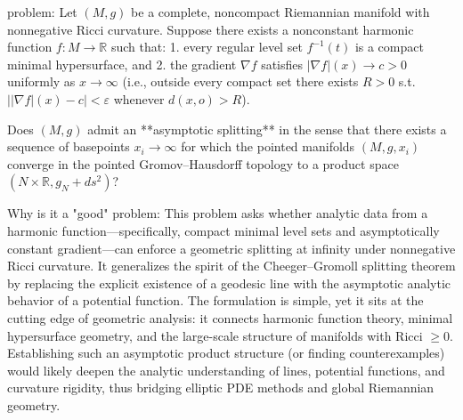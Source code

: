 problem:  
Let \((M,g)\) be a complete, noncompact Riemannian manifold with nonnegative Ricci curvature. Suppose there exists a nonconstant harmonic function \( f : M \to \mathbb{R} \) such that:  
1. every regular level set \( f^{-1}(t) \) is a compact minimal hypersurface, and  
2. the gradient \( \nabla f \) satisfies \( |\nabla f|(x) \to c > 0 \) uniformly as \( x \to \infty \) (i.e., outside every compact set there exists \(R>0\) s.t. \(||\nabla f|(x) - c| < \varepsilon\) whenever \(d(x,o) > R\)).  

Does \( (M,g) \) admit an **asymptotic splitting** in the sense that there exists a sequence of basepoints \(x_i \to \infty\) for which the pointed manifolds \((M,g,x_i)\) converge in the pointed Gromov–Hausdorff topology to a product space \( (N \times \mathbb{R}, g_N + ds^2) \)?  

Why is it a "good" problem:  
This problem asks whether analytic data from a harmonic function—specifically, compact minimal level sets and asymptotically constant gradient—can enforce a geometric splitting at infinity under nonnegative Ricci curvature. It generalizes the spirit of the Cheeger–Gromoll splitting theorem by replacing the explicit existence of a geodesic line with the asymptotic analytic behavior of a potential function. The formulation is simple, yet it sits at the cutting edge of geometric analysis: it connects harmonic function theory, minimal hypersurface geometry, and the large-scale structure of manifolds with Ricci \(\ge 0\). Establishing such an asymptotic product structure (or finding counterexamples) would likely deepen the analytic understanding of lines, potential functions, and curvature rigidity, thus bridging elliptic PDE methods and global Riemannian geometry.
